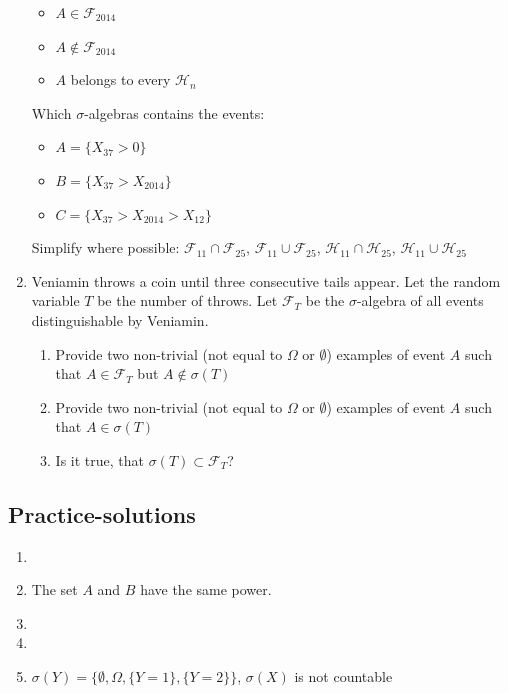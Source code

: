 \documentclass[pdftex,12pt,a4paper]{article}
\begin{document}
\begin{enumerate}
\begin{itemize}
\item $ A\in \mathcal{F}_{2014} $
\item $ A\notin \mathcal{F}_{2014} $
\item $A$ belongs to every $\mathcal{H}_{n}$
\end{itemize}

Which $ \sigma $-algebras contains the events:
\begin{itemize}
\item $ A= \{ X_{37}>0\}$
\item $ B=\{ X_{37}>X_{2014} \}$
\item $ C= \{X_{37}>X_{2014}>X_{12}\}$
\end{itemize}

Simplify where possible: $ \mathcal{F}_{11}\cap \mathcal{F}_{25} $, $ \mathcal{F}_{11}\cup \mathcal{F}_{25} $, $ \mathcal{H}_{11}\cap \mathcal{H}_{25} $, $ \mathcal{H}_{11}\cup \mathcal{H}_{25} $

\item Veniamin throws a coin until three consecutive tails appear.  Let the random variable $T$ be the number of throws. Let $ \mathcal{F}_{T} $ be the $ \sigma $-algebra of all events distinguishable by Veniamin. 
\begin{enumerate}
\item Provide two non-trivial (not equal to $\Omega$ or $\emptyset$) examples of event $A$ such that $A\in  \mathcal{F}_{T}$ but $A\notin \sigma(T)$
\item Provide two non-trivial (not equal to $\Omega$ or $\emptyset$) examples of event $A$ such that $A\in  \sigma(T)$
\item Is it true, that $\sigma(T) \subset \mathcal{F}_{T}$?
\end{enumerate}

\end{enumerate}

\subsection{Practice-solutions}

\begin{enumerate}
\item
\item The set $A$ and $B$ have the same power.
\item
\item
\item $\sigma(Y)=\{ \emptyset, \Omega, \{Y=1\}, \{Y=2\} \}$, $\sigma(X)$ is not countable
\end{enumerate}
\end{document}
